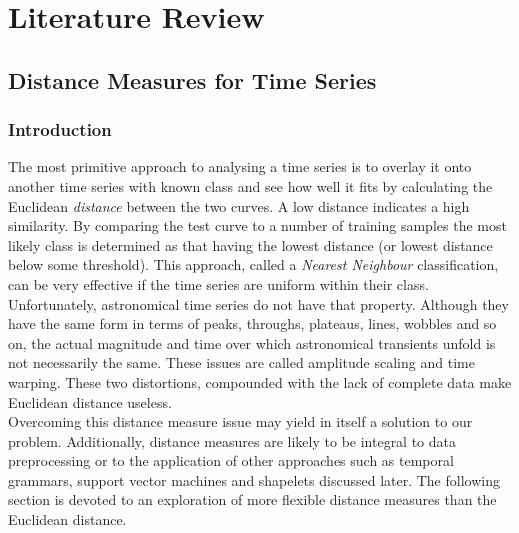 


%

\chapter{Literature Review} \label{chap:litreview}


%

\section{Distance Measures for Time Series}
	\label{sec:distancemeasures}
	
	\subsection{Introduction}
	The most primitive approach to analysing a time series is to overlay it onto another time series with known class and see how well it fits by calculating the Euclidean \emph{distance} between the two curves. A low distance indicates a high similarity. By comparing the test curve to a number of training samples the most likely class is determined as that having the lowest distance (or lowest distance below some threshold). This approach, called a \emph{Nearest Neighbour} classification, can be very effective if the time series are uniform within their class. 
	\\
	Unfortunately, astronomical time series do not have that property. Although they have the same form in terms of peaks, throughs, plateaus, lines, wobbles and so on, the actual magnitude and time over which astronomical transients unfold is not necessarily the same. These issues are called amplitude scaling and time warping. These two distortions, compounded with the lack of complete data make Euclidean distance useless. 
	\\
	Overcoming this distance measure issue may yield in itself a solution to our problem. Additionally, distance measures are likely to be integral to data preprocessing or to the application of other approaches such as temporal grammars, support vector machines and shapelets discussed later. The following section is devoted to an exploration of more flexible distance measures than the Euclidean distance.
	
